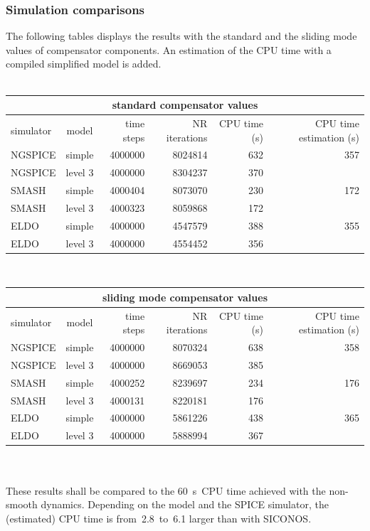 \subsubsection{Simulation comparisons}
The following tables displays the results with the standard and the sliding mode values of compensator components. An estimation of the CPU time with a compiled simplified model is added.
\\
\\
\begin{tabular}{|l|c|r|r|r|r|}
\hline
\multicolumn{6}{|c|}{\textbf{standard compensator values}}\\
\hline
simulator & model & time steps & NR iterations & CPU time (s) & CPU time estimation (s)\\
\hline
NGSPICE & simple  & 4000000 & 8024814 & 632 & 357\\
NGSPICE & level 3 & 4000000 & 8304237 & 370 & \\
\hline
SMASH   & simple  & 4000404 & 8073070 & 230 & 172\\
SMASH   & level 3 & 4000323 & 8059868 & 172 & \\
\hline
ELDO    & simple  & 4000000 & 4547579 & 388 & 355\\
ELDO    & level 3 & 4000000 & 4554452 & 356 & \\
\hline
\end{tabular}\\
\begin{tabular}{|l|c|r|r|r|r|}
\hline
\multicolumn{6}{|c|}{\textbf{sliding mode compensator values}}\\
\hline
simulator & model & time steps & NR iterations & CPU time (s) & CPU time estimation (s)\\
\hline
NGSPICE & simple  & 4000000 & 8070324 & 638 & 358\\
NGSPICE & level 3 & 4000000 & 8669053 & 385 & \\
\hline
SMASH   & simple  & 4000252 & 8239697 & 234 & 176\\
SMASH   & level 3 & 4000131 & 8220181 & 176 & \\
\hline
ELDO    & simple  & 4000000 & 5861226 & 438 & 365\\
ELDO    & level 3 & 4000000 & 5888994 & 367 & \\
\hline
\end{tabular}
\\
\\
These results shall be compared to the 60~s~CPU time achieved with the non-smooth dynamics.
Depending on the model and the SPICE simulator, the (estimated) CPU time is from~2.8~to~6.1
larger than with SICONOS.\\

